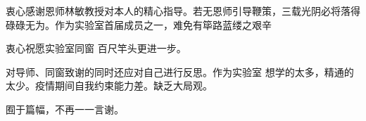 \begin{acknowledgement}
    衷心感谢恩师林敏教授对本人的精心指导。若无恩师引导鞭策，三载光阴必将落得碌碌无为。作为实验室首届成员之一，难免有筚路蓝缕之艰辛

    衷心祝愿实验室同窗 百尺竿头更进一步。

    对导师、同窗致谢的同时还应对自己进行反思。作为实验室 想学的太多，精通的太少。疫情期间自我约束能力差。缺乏大局观。

    囿于篇幅，不再一一言谢。
\end{acknowledgement}
